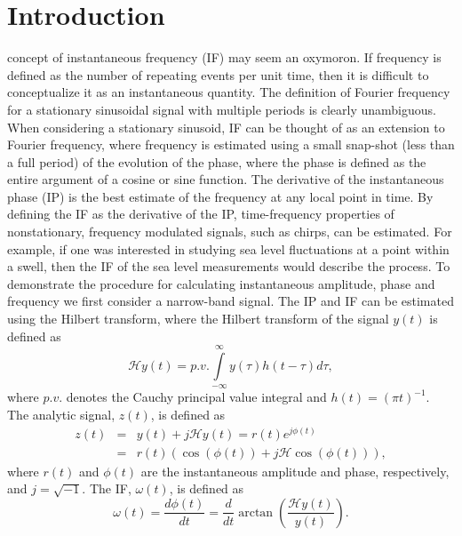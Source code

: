 \documentclass[a4paper]{IEEEtran}
\begin{document}
\section{Introduction}
 concept of instantaneous frequency (IF) may seem an oxymoron. If frequency is defined as the number of repeating events per unit time, then it is difficult to conceptualize it as an instantaneous quantity. The definition of Fourier frequency for a stationary sinusoidal signal with multiple periods is clearly unambiguous. When considering a stationary sinusoid, IF can be thought of as an extension to Fourier frequency, where frequency is estimated using a small snap-shot (less than a full period) of the evolution of the phase, where the phase is defined as the entire argument of a cosine or sine function. The derivative of the instantaneous phase (IP) is the best estimate of the frequency at any local point in time. By defining the IF as the derivative of the IP, time-frequency properties of nonstationary, frequency modulated signals, such as chirps, can be estimated. For example, if one was interested in studying sea level fluctuations at a point within a swell, then the IF of the sea level measurements would describe the process. To demonstrate the procedure for calculating instantaneous amplitude, phase and frequency we first consider a narrow-band signal. The IP and IF can be estimated using the Hilbert transform, where the Hilbert transform of the signal $y(t)$ is defined as
\begin{equation}\label{eq:HilbertTransform}
\mathcal{H}y\left( t \right) = p.v.\int\limits_{ - \infty }^\infty  {y\left( \tau  \right)h\left( {t - \tau } \right)} d\tau,
\end{equation}
where $p.v.$ denotes the Cauchy principal value integral and $h\left( t \right) = {\left( {\pi t} \right)^{ - 1}}$. The analytic signal, $z(t)$, is defined as
\begin{eqnarray}\label{eq:AnalyticSignal}
z\left( t \right) &=& y\left( t \right) + j\mathcal{H}y\left( t \right) = r\left( t \right){e^{j\phi \left( t \right)}}\\
    &=& r\left( t \right)\left(\cos\left(\phi\left(t\right)\right) + j \mathcal{H}\cos\left(\phi\left(t\right)\right)\right),
\end{eqnarray}
where $r(t)$ and $\phi(t)$ are the instantaneous amplitude and phase, respectively, and $j=\sqrt{-1}$. The IF, $\omega(t)$, is defined as
\begin{equation}\label{eq:InstantaneousFreq}
\omega \left( t \right) = \frac{d\phi \left( t \right)}{dt} = \frac{d}{dt}\arctan\left(\frac{\mathcal{H}y\left( t \right)}{y\left(t\right)}\right).
\end{equation}
\end{document}
